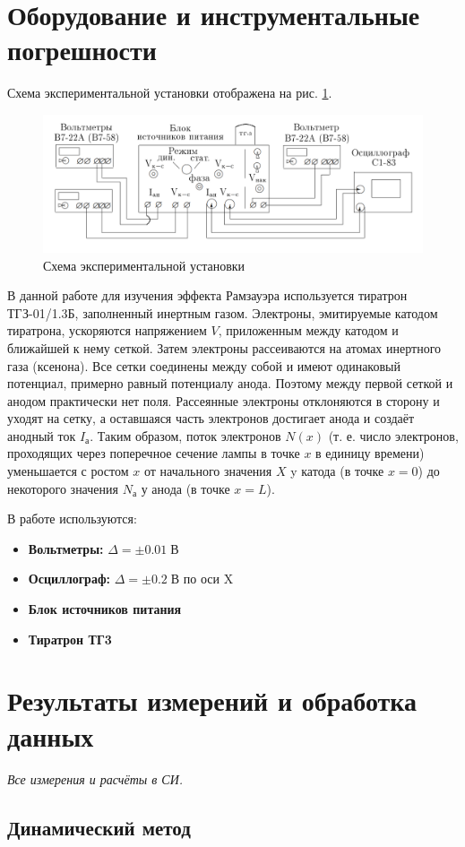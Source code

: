 \documentclass[a4paper]{article}
\newcommand{\Equip}[3]{
	
	\item{\bf #1:} $\Delta = \pm #2\; #3$}
\newcommand{\equip}[1]{
	
	\item{\bf #1}}
\begin{document}
\section{Оборудование и инструментальные погрешности}

Схема экспериментальной установки отображена на рис. \ref{fig:screenshot3}.
\begin{figure}
	\centering
	\includegraphics[width=1.0\linewidth]{Screenshot_3}
	\caption{Схема экспериментальной установки}
	\label{fig:screenshot3}
\end{figure}
В данной работе для изучения эффекта Рамзауэра используется
тиратрон ТГЗ-01/1.3Б, заполненный инертным газом. Электроны, эмитируемые катодом тиратрона, ускоряются напряжением $ V $, приложенным между катодом и ближайшей к нему сеткой. Затем электроны рассеиваются на атомах инертного газа (ксенона). Все сетки соединены между собой и имеют одинаковый потенциал, примерно равный потенциалу анода. Поэтому между первой сеткой и анодом практически нет поля. Рассеянные электроны отклоняются в сторону и уходят на сетку, а оставшаяся часть электронов достигает анода и создаёт анодный ток $ I_а $. Таким образом, поток электронов $ N(x) $ (т. е. число электронов, проходящих через поперечное сечение лампы в точке $ x $ в единицу времени) уменьшается с ростом $ x $ от начального значения $ X $ y катода (в точке $ x=0 $) до некоторого значения $ N_а $ у анода (в точке
$ x=L $).


В работе используются:
\begin{itemize}
	\Equip{Вольтметры}{0.01}{В}
	\Equip{Осциллограф}{0.2}{В} по оси X
	\equip{Блок источников питания}
	\equip{Тиратрон ТГ3}
\end{itemize}

\section{Результаты измерений и обработка данных}
\emph{Все измерения и расчёты в СИ.}

\subsection{Динамический метод}
\end{document}
